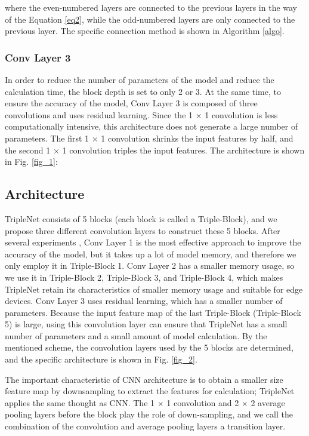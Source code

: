 \documentclass[default,iicol]{sn-jnl}
\theoremstyle{thmstyleone}\newtheorem{theorem}{Theorem}\newtheorem{proposition}[theorem]{Proposition}
\theoremstyle{thmstyletwo}\newtheorem{example}{Example}\newtheorem{remark}{Remark}
\theoremstyle{thmstylethree}\newtheorem{definition}{Definition}
\begin{document}
where the even-numbered layers are connected to the previous layers in the way of the Equation \ref{eq2}, while the odd-numbered layers are only connected to the previous layer. The specific connection method is shown in Algorithm \ref{algo}.

\subsubsection{Conv Layer 3}
In order to reduce the number of parameters of the model and reduce the calculation time, the block depth is set to only 2 or 3. At the same time, to ensure the accuracy of the model, Conv Layer 3 is composed of three convolutions and uses residual learning. Since the 1 × 1 convolution is less computationally intensive, this architecture does not generate a large number of parameters. The first 1 × 1 convolution shrinks the input features by half, and the second 1 × 1 convolution triples the input features. The architecture is shown in Fig. \ref{fig_1}:



\subsection{Architecture}
TripleNet consists of 5 blocks (each block is called a Triple-Block), and we propose three different convolution layers to construct these 5 blocks. After several experiments \cite{huang2017densely,ju2022threshnet,hu2017log}, Conv Layer 1 is the most effective approach to improve the accuracy of the model, but it takes up a lot of model memory, and therefore we only employ it in Triple-Block 1. Conv Layer 2 has a smaller memory usage, so we use it in Triple-Block 2, Triple-Block 3, and Triple-Block 4, which makes TripleNet retain its characteristics of smaller memory usage and suitable for edge devices. Conv Layer 3 uses residual learning, which has a smaller number of parameters. Because the input feature map of the last Triple-Block (Triple-Block 5) is large, using this convolution layer can ensure that TripleNet has a small number of parameters and a small amount of model calculation. By the mentioned scheme, the convolution layers used by the 5 blocks are determined, and the specific architecture is shown in Fig. \ref{fig_2}.

The important characteristic of CNN architecture is to obtain a smaller size feature map by downsampling to extract the features for calculation; TripleNet applies the same thought as CNN. The 1 × 1 convolution and 2 × 2 average pooling layers before the block play the role of down-sampling, and we call the combination of the convolution and average pooling layers a transition layer.
\end{document}
